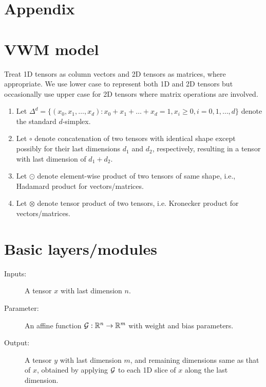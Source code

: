 \section{Appendix}



\section{VWM model}

\begin{notation}
	Treat 1D tensors as column vectors and 2D tensors as matrices, where appropriate.
	We use lower case to represent both 1D and 2D tensors but occasionally use upper case
	for 2D tensors where matrix operations are involved.
	
	\begin{enumerate}
		\item Let 
		$\Delta^d = \{ (x_0, x_1, \dots, x_d) : x_0 + x_1 + \dots + x_d = 1, x_i \ge 0, i = 0, 1, \dots, d\}$ denote the standard $d$-simplex.	
		
		\item  Let $\circ$ denote concatenation of two tensors with identical shape except possibly
		for their last dimensions $d_1$ and $d_2$, respectively,  
		resulting in a tensor with last dimension of $d_1+d_2$. 
		
		\item Let $\odot$ denote  element-wise product of two tensors of same shape,
		i.e., Hadamard product for vectors/matrices.
		
		\item Let $\otimes$ denote tensor product of two tensors, 
		i.e. Kronecker product for vectors/matrices.
	\end{enumerate}
\end{notation}	

\section{Basic layers/modules}


\begin{description}
	\item[Inputs:] A tensor $x$ with last dimension $n$.
	\item[Parameter:] An affine function $\mathcal{G}: \mathbb{R}^n \to \mathbb{R}^m$ with 
	weight and bias parameters.
	
	\item[Output:] A tensor $y$ with last dimension $m$, and remaining dimensions
	same as that of $x$, obtained by applying $\mathcal{G}$ to each 1D slice of $x$
	along the last dimension.
\end{description}


